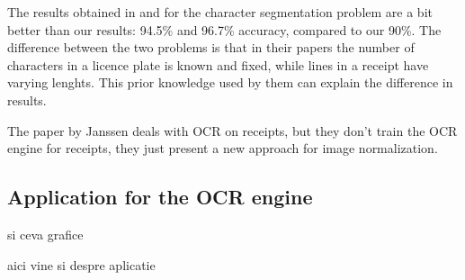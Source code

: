 The results obtained in \cite{kahraman2003license} and \cite{Franc_2005} for the character segmentation problem are a bit better than our results: 94.5\% and 96.7\% accuracy, compared to our 90\%. The difference between the two problems is that in their papers the number of characters in a licence plate is known and fixed, while lines in a receipt have varying lenghts. This prior knowledge used by them can explain the difference in results. 

The paper by Janssen\cite{janssen2012receipts2go} deals with OCR on receipts, but they don't train the OCR engine for receipts, they just present a new approach for image normalization.


\subsection{Application for the OCR engine}


si ceva grafice 

aici vine si despre aplicatie


